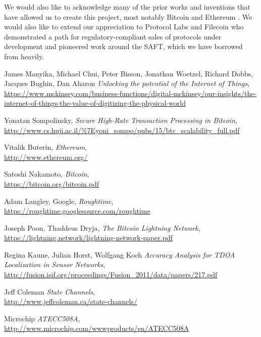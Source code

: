 \documentclass[a4paper,12pt]{article}
\begin{document}
We would also like to acknowledge many of the prior works and inventions that have allowed us to create this project, most notably Bitcoin \cite{bitcoin} and Ethereum \cite{ethereum}. We would also like to extend our appreciation to Protocol Labs \cite{protocol} and Filecoin \cite{filecoin} who demonstrated a path for regulatory-compliant sales of protocols under development and pioneered work around the SAFT, which we have borrowed from heavily.
\newpage

\begin{thebibliography}{9}

	James Manyika, Michael Chui, Peter Bisson, Jonathan Woetzel, Richard Dobbs, Jacques Bughin, Dan Aharon
		\textit{Unlocking the potential of the Internet of Things}, \\
		\url{https://www.mckinsey.com/business-functions/digital-mckinsey/our-insights/the-internet-of-things-the-value-of-digitizing-the-physical-world}

	Yonatan Sompolinsky,
		\textit{Secure High-Rate Transaction Processing in Bitcoin}, \\
		\url{http://www.cs.huji.ac.il/\%7Eyoni\_sompo/pubs/15/btc\_scalability\_full.pdf}

	Vitalik Buterin,
		\textit{Ethereum},\\
		\url{http://www.ethereum.org/}

	Satoshi Nakamoto,
		\textit{Bitcoin}, \\
		\url{https://bitcoin.org/bitcoin.pdf}

	Adam Langley, Google,
		\textit{Roughtime}, \\
		\url{https://roughtime.googlesource.com/roughtime}

	Joseph Poon, Thaddeus Dryja,
		\textit{The Bitcoin Lightning Network}, \\
		\url{https://lightning.network/lightning-network-paper.pdf}

	Regina Kaune, Julian Horst, Wolfgang Koch
		\textit{Accuracy Analysis for TDOA Localization in Sensor Networks}, \\
		\url{http://fusion.isif.org/proceedings/Fusion_2011/data/papers/217.pdf}	

	Jeff Coleman
		\textit{State Channels}, \\
		\url{http://www.jeffcoleman.ca/state-channels/}

	Microchip
		\textit{ATECC508A}, \\
		\url{http://www.microchip.com/wwwproducts/en/ATECC508A}


\end{thebibliography}
\end{document}
